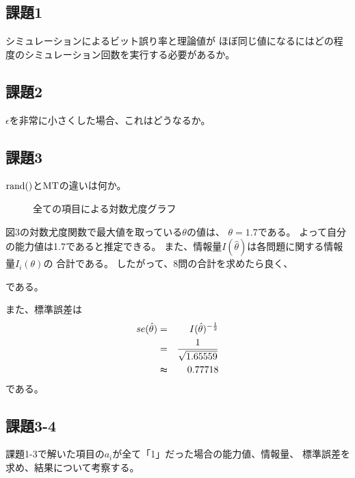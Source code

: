 \documentclass[12pt]{jarticle}
\begin{document}
\subsection{課題1}
\begin{shadebox}
    シミュレーションによるビット誤り率と理論値が
    ほぼ同じ値になるにはどの程度のシミュレーション回数を実行する必要があるか。
\end{shadebox}
\subsection{課題2}
\begin{shadebox}
    $\epsilon$を非常に小さくした場合、これはどうなるか。
\end{shadebox}
\subsection{課題3}
\begin{shadebox}
    $\rm{rand()}$と$\rm{MT}$の違いは何か。
\end{shadebox}

\begin{figure}[h]
    \begin{center}
    \end{center}
    \caption{全ての項目による対数尤度グラフ}
\end{figure}
\clearpage


図3の対数尤度関数で最大値を取っている$\theta$の値は、
$\theta=1.7$である。
よって自分の能力値は1.7であると推定できる。
また、情報量$I(\hat{\theta})$は各問題に関する情報量$I_i({\theta})$の
合計である。
したがって、8問の合計を求めたら良く、

である。

また、標準誤差は
\begin{eqnarray*}
    se(\hat{\theta})&=&I(\hat{\theta})^{-\frac{1}{2}}\\
    &= &\frac{1}{\sqrt{ 1.65559}}\\
    &\thickapprox& 0.77718
\end{eqnarray*}
である。

\subsection{課題3-4}
\begin{shadebox}
    課題1-3で解いた項目の$a_i$が全て「1」だった場合の能力値、情報量、
    標準誤差を求め、結果について考察する。
\end{shadebox}
\end{document}
